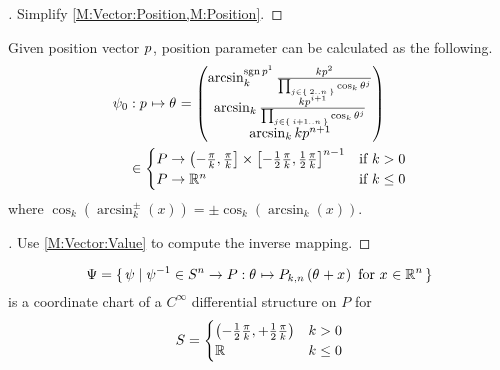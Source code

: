 \documentclass[stu, babel, american, biblatex, a4paper, leqno, draftall]{apa7}
\begin{document}
\begin{proof}[]
    Simplify \cref{M:Vector:Position,M:Position}.
\end{proof}
\begin{lemma}\label{M:Parameter:Value}
    Given position vector $\tensor{p}{}$, position parameter can be calculated as the following.
    \begin{align*}
        \psi_0
         & : \tensor{p}{} \mapsto \tensor{\theta}{}
        =
        \begin{pmatrix}
            \arcsin_k^{\sign{\tensor{p}{^1}}}{\frac{k\tensor{p}{^2}}{\prod_{j\in\Set{2..n}}{\cos_k{\tensor{\theta}{^j}}}}} \\
            \arcsin_k{\frac{k\tensor{p}{^{i+1}}}{\prod_{j\in\Set{i+1..n}}{\cos_k{\tensor{\theta}{^j}}}}}                   \\
            \arcsin_k{k\tensor{p}{^{n+1}}}                                                                                 \\
        \end{pmatrix}                  \\
         & \in
        \begin{cases}
            P \to \left(-\frac{\pi}{k}, \frac{\pi}{k}\right]\times\left[-\frac{1}{2}\frac{\pi}{k}, \frac{1}{2}\frac{\pi}{k}\right]^{n-1} & \text{if $k>0$}   \\
            P \to \R^{n}                                                                                                              & \text{if $k\le0$} \\
        \end{cases}
    \end{align*}
    where $\cos_k\left(\arcsin_k^{\pm}\left(x\right)\right) = \pm \cos_k\left(\arcsin_k\left(x\right)\right)$.
\end{lemma}
\begin{proof}[]
    \skipped

    Use \cref{M:Vector:Value} to compute the inverse mapping.
\end{proof}
\begin{lemma}\label{CoordinateChart}
    \begin{equation*}
        \Psi=\set{\psi|
            \psi^{-1}
            \in S^n \to P
            :\tensor{\theta}{}\mapsto P_{k,n}\left(\tensor{\theta}{}+\tensor{x}{}\right)
            \text{ for }
            \tensor{x}{} \in \R^n
        }
    \end{equation*} is a coordinate chart of a $C^\infty$ differential structure on $P$
    for \begin{equation*}
        S=
        \begin{cases}
            \left(-\frac{1}{2}\frac{\pi}{k},+\frac{1}{2}\frac{\pi}{k}\right) & \text{$k>0$} \\
            \mathbb{R} & \text{$k\le0$}
        \end{cases}
    \end{equation*}
\end{lemma}
\end{document}
